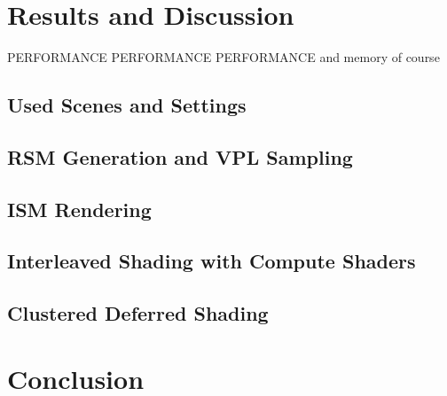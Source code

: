 

\chapter{Results and Discussion}

PERFORMANCE PERFORMANCE PERFORMANCE
and memory of course
\section{Used Scenes and Settings}

\section{RSM Generation and VPL Sampling}

\section{ISM Rendering}

\section{Interleaved Shading with Compute Shaders}

\section{Clustered Deferred Shading}





\chapter{Conclusion}

